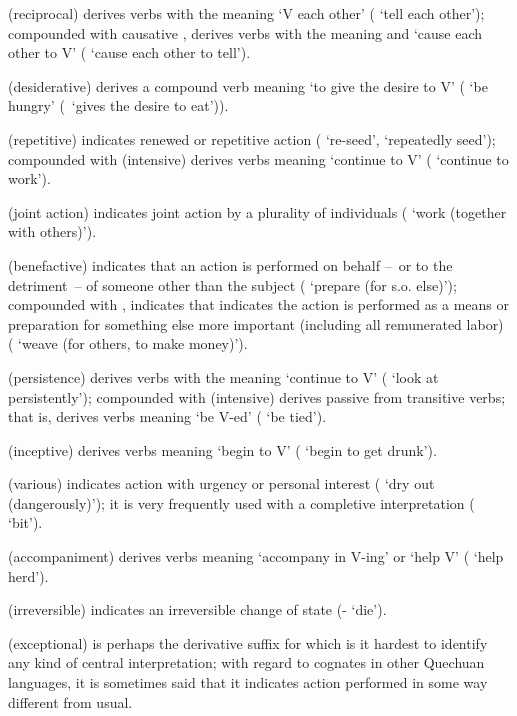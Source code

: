  (reciprocal) derives verbs with the meaning ‘V each other’ ( ‘tell each other’); compounded with causative ,  derives verbs with the meaning and ‘cause each other to V’ ( ‘cause each other to tell’).

 (desiderative) derives a compound verb meaning ‘to give the desire to V’ ( ‘be hungry’ (\lit~‘gives the desire to eat’)).

 (repetitive) indicates renewed or repetitive action ( ‘re-seed’, ‘repeatedly seed’); compounded with  (intensive)  derives verbs meaning ‘continue to V’ ( ‘continue to work’).

 (joint action) indicates joint action by a plurality of individuals ( ‘work (together with others)’).

 (benefactive) indicates that an action is performed on behalf --~or to the detriment~-- of someone other than the subject ( ‘prepare (for s.o. else)’); compounded with ,  indicates that indicates the action is performed as a means or preparation for something else more important (including all remunerated labor) ( ‘weave (for others, to make money)’).

 (persistence) derives verbs with the meaning ‘continue to V’ ( ‘look at persistently’); compounded with  (intensive)  derives passive from transitive verbs; that is,  derives verbs meaning ‘be V-ed’ ( ‘be tied’).

 (inceptive) derives verbs meaning ‘begin to V’ ( ‘begin to get drunk’).

 (various) indicates action with urgency or personal interest ( ‘dry out (dangerously)’); it is very frequently used with a completive interpretation ( ‘bit’).

 (accompaniment) derives verbs meaning ‘accompany in V-ing’ or ‘help V’ ( ‘help herd’).

 (irreversible) indicates an irreversible change of state (- ‘die’).

 (exceptional) is perhaps the derivative suffix for which is it hardest to identify any kind of central interpretation; with regard to cognates in other Quechuan languages, it is sometimes said that it indicates action performed in some way different from usual. 

